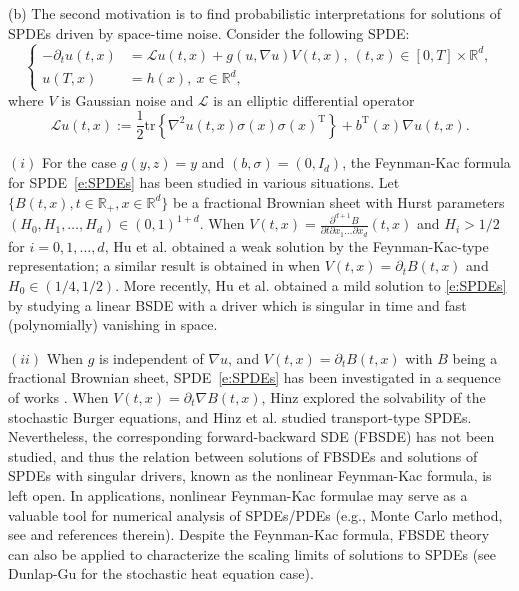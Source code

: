 \documentclass[11pt,reqno]{amsart}
\def\R{\mathbb R}
\numberwithin{equation}{section}
\begin{document}
(b) The second motivation is to find probabilistic interpretations for solutions of SPDEs driven by space-time noise. Consider the following SPDE:
\begin{equation}\label{e:SPDEs}
\left\{
\begin{aligned}
-\partial_{t}u(t,x) &= \mathcal{L}u(t,x) + g\left(u, \nabla u\right)V(t,x),\ (t,x)\in[0,T]\times\mathbb{R}^{d},\\
u(T,x) &= h(x),\ x\in\mathbb{R}^{d},
\end{aligned}\right.
\end{equation}
where $V$ is Gaussian noise and $\mathcal{L}$ is an elliptic differential operator  \[\mathcal{L}u(t,x):=\frac{1}{2}\text{tr}\left\{\nabla^{2}u(t,x)\sigma(x)\sigma(x)^{\text{T}}\right\} + b^{\text{T}}(x)\nabla u(t,x).\] 

$(i)$ For the case $g(y,z) = y$ and $(b,\sigma)=(0,I_{d})$, the Feynman-Kac formula for SPDE~\eqref{e:SPDEs} has been studied in various situations. Let $\{B(t,x), t\in\R_+, x\in\R^d\}$ be a fractional Brownian sheet with Hurst parameters $(H_{0},H_{1},\dots,H_{d})\in(0,1)^{1+d}$. When $V(t,x)=\frac{\partial^{d+1}B}{\partial {t}\partial {x_{1}}\dots\partial {x_{d}}}(t,x)$ and $H_{i}>1/2$ for $i=0,1, \dots, d$, Hu et al. \cite{HuNualartSong-2011} obtained a weak solution by the Feynman-Kac-type representation; a similar result is obtained in \cite{hu2012feynman} when $V(t,x) = \partial_{t}B(t,x)$ and $H_{0}\in(1/4,1/2)$. More recently, Hu et al. \cite{HuLiMi} obtained a mild solution to \eqref{e:SPDEs} by studying a linear BSDE with a driver which is  singular in time and fast (polynomially) vanishing in space. 

$(ii)$ When $g$ is independent of $\nabla u$, and $V(t,x) = \partial_{t}B(t,x)$ with $B$ being a fractional Brownian sheet, SPDE~\eqref{e:SPDEs} has been investigated in a sequence of works \cite{hinz2009gradientI,hinz2009gradientII,hinz2012semigroups}. 
When 
$V(t,x) = \partial_{t}\nabla B(t,x)$, Hinz \cite{hinz2011burgers} explored the solvability of the stochastic Burger equations, and Hinz et al. \cite{hinz2013elementary} studied transport-type SPDEs.
Nevertheless, the corresponding forward-backward SDE (FBSDE) has not been studied, and thus the relation between solutions of FBSDEs and solutions of SPDEs with singular drivers, known as the nonlinear Feynman-Kac formula, is left open. In applications, nonlinear Feynman-Kac formulae may serve as a valuable tool for numerical analysis of SPDEs/PDEs (e.g., Monte Carlo method, see \cite[Chapter 5]{zhang2017backward} and references therein).  Despite the Feynman-Kac formula, FBSDE theory can also be applied to characterize the scaling limits of solutions to SPDEs (see Dunlap-Gu \cite{Dunlap-Gu} for the  stochastic heat equation case). 
\end{document}
